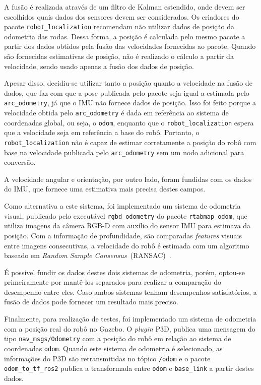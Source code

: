 \documentclass[repeatfields,xlists,xpacks,oneside,yearsonly]{ufrgscca}
\begin{document}
A fusão é realizada através de um filtro de Kalman estendido, onde
devem ser escolhidos quais dados dos sensores devem ser considerados.
Os criadores do pacote \texttt{robot\_localization} recomendam não
utilizar dados de posição da odometria das rodas. Dessa forma, a
posição é calculada pelo mesmo pacote a partir dos dados obtidos pela
fusão das velocidades fornecidas ao pacote. Quando são fornecidas
estimativas de posição, não é realizado o cálculo a partir da
velocidade, sendo usado apenas a fusão dos dados de posição.

Apesar disso, decidiu-se utilizar tanto a posição quanto a velocidade
na fusão de dados, que faz com que a pose publicada pelo pacote seja
igual a estimada pelo \texttt{arc\_odometry}, já que o IMU não
fornece dados de posição. Isso foi feito porque a velocidade obtida
pelo \texttt{arc\_odometry} é dada em referência ao sistema de
coordenadas global, ou seja, o \texttt{odom}, enquanto que o
\texttt{robot\_localization} espera que a velocidade seja em
referência a base do robô. Portanto, o \texttt{robot\_localization}
não é capaz de estimar corretamente a posição do robô com base na
velocidade publicada pelo \texttt{arc\_odometry} sem um nodo
adicional para conversão.

A velocidade angular e orientação, por outro lado, foram fundidas com
os dados do IMU, que fornece uma estimativa mais precisa destes
campos.

Como alternativa a este sistema, foi implementado um sistema de
odometria visual, publicado pelo executável \texttt{rgbd\_odometry}
do pacote \texttt{rtabmap\_odom}, que utiliza imagens da câmera RGB-D
com auxílio do sensor IMU para estimava da posição. Com a informação
de profundidade, são comparadas \textit{features} visuais entre
imagens consecutivas, a velocidade do robô é estimada com um
algoritmo baseado em \textit{Random Sample
    Consensus}~(RANSAC)~\cite{rtabmap_odom}.

É possível fundir os dados destes dois sistemas de odometria,
porém, optou-se primeiramente por mantê-los separados para realizar a comparação
do desempenho entre eles. Caso ambos sistemas tenham desempenhos satisfatórios,
a fusão de dados pode fornecer um resultado mais preciso.

Finalmente, para realização de testes, foi implementado um sistema de
odometria com a posição real do robô no Gazebo. O \textit{plugin}
P3D, publica uma mensagem do tipo \texttt{nav\_msgs/Odometry} com a
posição do robô em relação ao sistema de coordenadas \texttt{odom}.
Quando este sistema de odometria é selecionado, as informações do P3D
são retransmitidas no tópico \texttt{/odom} e o pacote
\texttt{odom\_to\_tf\_ros2} publica a transformada entre
\texttt{odom} e \texttt{base\_link} a partir destes dados.
\end{document}
